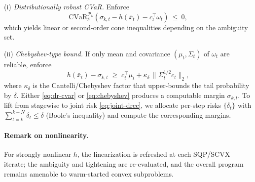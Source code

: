 \documentclass[journal]{IEEEtran}
\theoremstyle{definition}
\begin{document}
(i) \emph{Distributionally robust CVaR.} Enforce
\begin{equation}
\mathrm{CVaR}_{\delta}^{\mathcal{P}_k}\!\left(\sigma_{k,t}-h(\bar{x}_t)-c_t^\top\omega_t\right)\ \le\ 0,
\label{eq:dr-cvar}
\end{equation}
which yields linear or second-order cone inequalities depending on the ambiguity set.

(ii) \emph{Chebyshev-type bound.} If only mean and covariance $(\mu_t,\Sigma_t)$ of $\omega_t$ are reliable,
enforce
\begin{equation}
h(\bar{x}_t)-\sigma_{k,t} \;\ge\; c_t^\top\mu_t + \kappa_\delta \,\| \Sigma_t^{1/2} c_t \|_2,
\label{eq:chebyshev}
\end{equation}
where $\kappa_\delta$ is the Cantelli/Chebyshev factor that upper-bounds the tail probability by $\delta$.
Either \eqref{eq:dr-cvar} or \eqref{eq:chebyshev} produces a computable margin $\sigma_{k,t}$.
To lift from stagewise to joint risk \eqref{eq:joint-drcc}, we allocate per-step risks $\{\delta_t\}$
with $\sum_{t=k}^{k+N}\delta_t\le \delta$ (Boole's inequality) and compute the corresponding margins.

\paragraph*{Remark on nonlinearity.}
For strongly nonlinear $h$, the linearization is refreshed at each SQP/SCVX iterate; the ambiguity and
tightening are re-evaluated, and the overall program remains amenable to warm-started convex subproblems.
\end{document}

